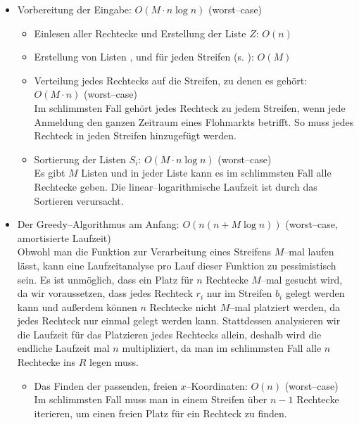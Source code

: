 \begin{itemize}
	\item Vorbereitung der Eingabe: $O(M \cdot n \log n)$ (worst--case)
	\begin{itemize}
		\item Einlesen aller Rechtecke und Erstellung der Liste $Z$: $O(n)$

		\item Erstellung von Listen ,  und 
		für jeden Streifen (s. ): $O(M)$

		\item Verteilung jedes Rechtecks auf die Streifen, zu denen es gehört: $O(M \cdot n)$ (worst--case)\\
		Im schlimmsten Fall gehört jedes Rechteck zu jedem Streifen, wenn jede Anmeldung
		den ganzen Zeitraum eines Flohmarkts betrifft.
		So muss jedes Rechteck in jeden Streifen hinzugefügt werden.

		\item Sortierung der Listen $S_i$: $O(M \cdot n \log n)$ (worst--case)\\
		Es gibt $M$ Listen und in jeder Liste kann es im schlimmsten Fall
		alle Rechtecke geben. Die linear--logarithmische Laufzeit
		ist durch das Sortieren verursacht.
	\end{itemize}

	\item Der Greedy--Algorithmus am Anfang: $O(n(n + M \log n))$ (worst--case, amortisierte Laufzeit)\\
	Obwohl man die Funktion zur Verarbeitung eines Streifens $M$--mal 
	laufen lässt, kann eine Laufzeitanalyse pro Lauf dieser Funktion zu pessimistisch sein.
	Es ist unmöglich, dass ein Platz für $n$ Rechtecke $M$--mal gesucht wird,
	da wir voraussetzen, dass jedes Rechteck $r_i$ nur im Streifen $b_i$ gelegt werden kann
	und außerdem können $n$ Rechtecke nicht $M$--mal platziert werden, da jedes Rechteck
	nur einmal gelegt werden kann.
	Stattdessen analysieren wir die Laufzeit für das Platzieren jedes Rechtecks allein,
	deshalb wird die endliche Laufzeit mal $n$ multipliziert, da man im schlimmsten Fall
	alle $n$ Rechtecke ins $R$ legen muss.

	\begin{itemize}
		\item Das Finden der passenden, freien $x$--Koordinaten: $O(n)$ (worst--case)\\
		Im schlimmsten Fall muss man in einem Streifen über $n-1$ Rechtecke iterieren,
		um einen freien Platz für ein Rechteck zu finden.


\end{itemize}
\end{itemize}
